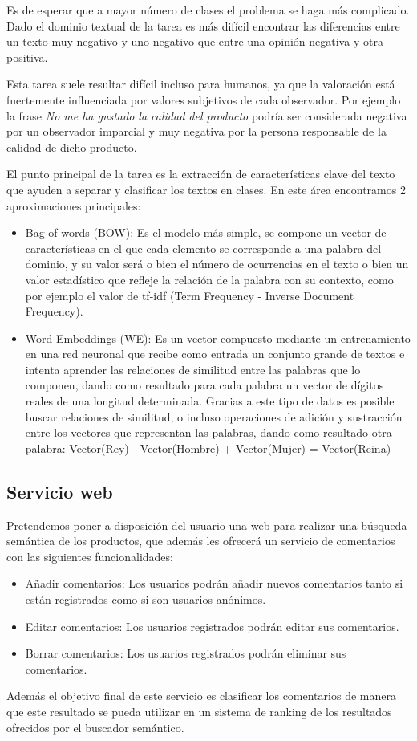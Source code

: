 Es de esperar que a mayor número de clases el problema se haga más complicado. Dado el dominio textual de la tarea es más difícil encontrar las diferencias entre un texto muy negativo y uno negativo que entre una opinión negativa y otra positiva.

Esta tarea suele resultar difícil incluso para humanos, ya que la valoración está fuertemente influenciada por valores subjetivos de cada observador. Por ejemplo la frase \emph{No me ha gustado la calidad del producto} podría ser considerada negativa por un observador imparcial y muy negativa por la persona responsable de la calidad de dicho producto.

El punto principal de la tarea es la extracción de características clave del texto que ayuden a separar y clasificar los textos en clases. En este área encontramos 2 aproximaciones principales:

\begin{itemize}
	\item Bag of words (BOW): Es el modelo más simple, se compone un vector de características en el que cada elemento se corresponde a una palabra del dominio, y su valor será o bien el número de ocurrencias en el texto o bien un valor estadístico que refleje la relación de la palabra con su contexto, como por ejemplo el valor de tf-idf (Term Frequency - Inverse Document Frequency).
	\item Word Embeddings (WE): Es un vector compuesto mediante un entrenamiento en una red neuronal que recibe como entrada un conjunto grande de textos e intenta aprender las relaciones de similitud entre las palabras que lo componen, dando como resultado para cada palabra un vector de dígitos reales de una longitud determinada. Gracias a este tipo de datos es posible buscar relaciones de similitud, o incluso operaciones de adición y sustracción entre los vectores que representan las palabras, dando como resultado otra palabra:
	\subitem Vector(Rey) - Vector(Hombre) + Vector(Mujer)  = Vector(Reina)
\end{itemize}


\subsection{Servicio web}
Pretendemos poner a disposición del usuario una web para realizar una búsqueda semántica de los productos, que además les ofrecerá un servicio de comentarios con las siguientes funcionalidades:

\begin{itemize}
	\item Añadir comentarios: Los usuarios podrán añadir nuevos comentarios tanto si están registrados como si son usuarios anónimos.
	\item Editar comentarios: Los usuarios registrados podrán editar sus comentarios.
	\item Borrar comentarios: Los usuarios registrados podrán eliminar sus comentarios.
\end{itemize}

Además el objetivo final de este servicio es clasificar los comentarios de manera que este resultado se pueda utilizar en un sistema de ranking de los resultados ofrecidos por el buscador semántico.
